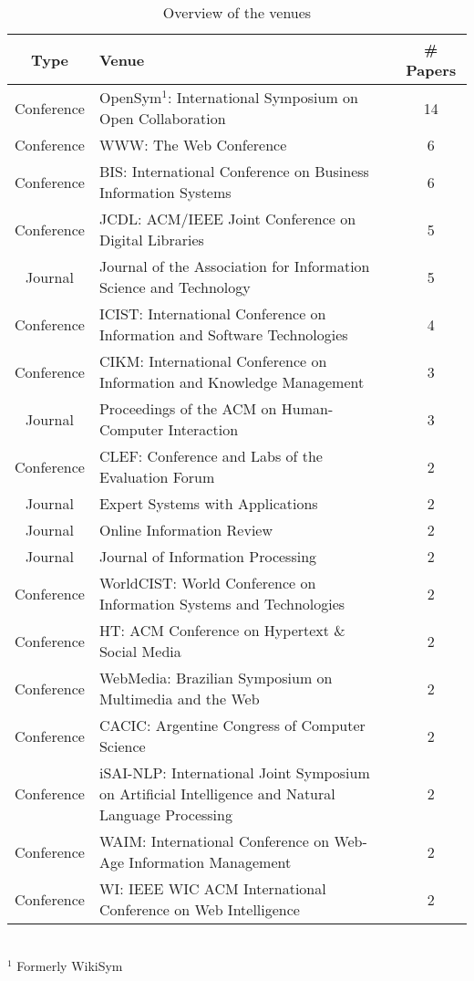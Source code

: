 \begin{table}[htbp]
    \caption{Overview of the venues}
    \label{tab:venues}
    \centering
    \begin{tabular}{c m{} c}
        \toprule
        \textbf{Type} & \textbf{Venue} & \textbf{\# Papers} \\
        \midrule
        Conference & OpenSym$^1$: International Symposium on Open Collaboration & 14 \\
        Conference & WWW: The Web Conference & 6 \\
        Conference & BIS: International Conference on Business Information Systems & 6 \\
        Conference & JCDL: ACM/IEEE Joint Conference on Digital Libraries & 5 \\
        Journal & Journal of the Association for Information Science and Technology & 5 \\
        Conference & ICIST: International Conference on Information and Software Technologies & 4 \\
        Conference & CIKM: International Conference on Information and Knowledge Management & 3 \\
        Journal & Proceedings of the ACM on Human-Computer Interaction & 3 \\
        Conference & CLEF: Conference and Labs of the Evaluation Forum & 2 \\
        Journal & Expert Systems with Applications & 2 \\
        Journal & Online Information Review & 2 \\
        Journal & Journal of Information Processing & 2 \\
        Conference & WorldCIST: World Conference on Information Systems and Technologies & 2 \\
        Conference & HT: ACM Conference on Hypertext \& Social Media & 2 \\
        Conference & WebMedia: Brazilian Symposium on Multimedia and the Web & 2 \\
        Conference & CACIC: Argentine Congress of Computer Science & 2 \\
        Conference & iSAI-NLP: International Joint Symposium on Artificial Intelligence and Natural Language Processing & 2 \\
        Conference & WAIM: International Conference on Web-Age Information Management & 2 \\
        Conference & WI: IEEE WIC ACM International Conference on Web Intelligence & 2 \\
        \bottomrule
    \end{tabular}
    \\ \vspace{0.1cm}
    \footnotesize
    $^1$ Formerly WikiSym
\end{table}
